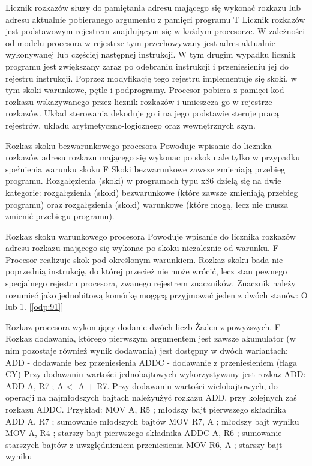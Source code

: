 \answer
{Licznik rozkazów}
{słuzy do pamiętania adresu mającego się wykonać rozkazu lub adresu aktualnie pobieranego argumentu z pamięci programu}
{T}
{
Licznik rozkazów jest podstawowym rejestrem znajdującym się w każdym procesorze. W zależności od modelu procesora w rejestrze tym przechowywany jest adres aktualnie wykonywanej lub częściej następnej instrukcji. W tym drugim wypadku licznik programu jest zwiększany zaraz po odebraniu instrukcji i przeniesieniu jej do rejestru instrukcji. Poprzez modyfikację tego rejestru implementuje się skoki, w tym skoki warunkowe, pętle i podprogramy.
}
{
Procesor pobiera z pamięci kod rozkazu wskazywanego przez licznik rozkazów i umieszcza go w rejestrze rozkazów. Układ sterowania dekoduje go i na jego podstawie steruje pracą rejestrów, układu arytmetyczno-logicznego oraz wewnętrznych szyn.
}
\label{odp:100}

\label{odp:101}
\answer
{Rozkaz skoku bezwarunkowego procesora}
{Powoduje wpisanie do licznika rozkazów adresu rozkazu mającego się wykonac po skoku ale tylko w przypadku spełnienia warunku skoku}
{F}
{
Skoki bezwarunkowe zawsze zmieniają przebieg programu.
}
{
Rozgałęzienia (skoki) w programach typu x86 dzielą się na dwie kategorie: rozgałęzienia (skoki) bezwarunkowe (które zawsze zmieniają przebieg programu) oraz rozgałęzienia (skoki) warunkowe (które mogą, lecz nie musza zmienić przebiegu programu).
}

\label{odp:102}
\answer
{Rozkaz skoku warunkowego procesora}
{Powoduje wpisanie do licznika rozkazów adresu rozkazu mającego się wykonac po skoku niezaleznie od warunku.}
{F}
{
Procesor realizuje skok pod określonym warunkiem. Rozkaz skoku bada nie poprzednią instrukcję, do której przecież nie może wrócić, lecz stan pewnego specjalnego rejestru procesora, zwanego rejestrem znaczników.
}
{
Znacznik należy rozumieć jako jednobitową komórkę mogącą przyjmować jeden z dwóch stanów: O lub 1.
[\ref{odp:91}]
}

\label{odp:103}
\answer
{Rozkaz procesora wykonujący dodanie dwóch liczb}
{Żaden z powyższych.}
{F}
{
Rozkaz dodawania, którego pierwszym argumentem jest zawsze akumulator (w nim pozostaje również wynik dodawania) jest dostępny w dwóch wariantach:
ADD - dodawanie bez przeniesienia
ADDC - dodawanie z przeniesieniem (flaga CY)
}
{
Przy dodawaniu wartości jednobajtowych wykorzystywany jest rozkaz ADD:
ADD A, R7 ; A <- A + R7.
Przy dodawaniu wartości wielobajtowych, do operacji na najmłodszych bajtach należyużyć rozkazu ADD, przy kolejnych zaś rozkazu ADDC. Przykład:
MOV A, R5 ; młodszy bajt pierwszego składnika
ADD A, R7 ; sumowanie młodszych bajtów
MOV R7, A ; młodszy bajt wyniku
MOV A, R4 ; starszy bajt pierwszego składnika
ADDC A, R6 ; sumowanie starszych bajtów z uwzględnieniem przeniesienia
MOV R6, A ; starszy bajt wyniku
}

